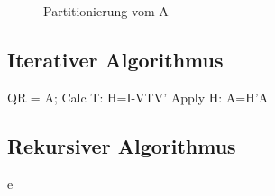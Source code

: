 \begin{figure} 
	\centering
	
	\caption{Partitionierung vom A}
	\label{fig:patrA}
\end{figure}


\subsection{Iterativer Algorithmus}

\begin{algorithmic}
	\State QR = A;
		\State Calc T: H=I-VTV'
		\State Apply H: A=H'A
	\EndIf
\EndFor

\end{algorithmic}


\subsection{Rekursiver Algorithmus}


e